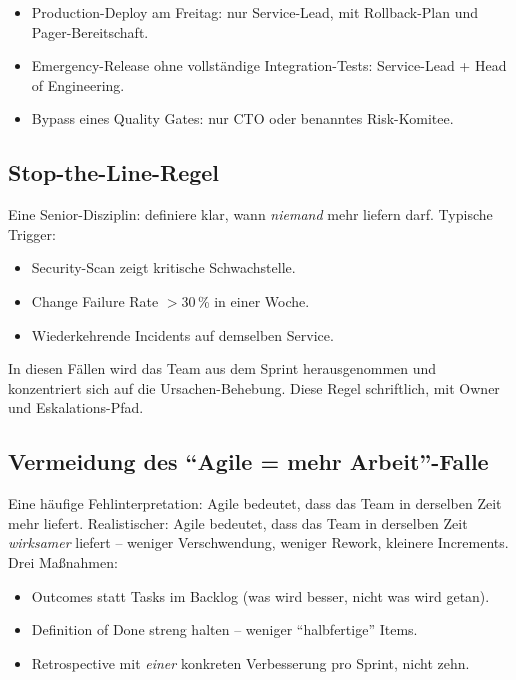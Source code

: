 \documentclass[11pt,a4paper,oneside]{article}
\begin{document}
\begin{itemize}
  \item Production-Deploy am Freitag: nur Service-Lead, mit Rollback-Plan und Pager-Bereitschaft.
  \item Emergency-Release ohne vollständige Integration-Tests: Service-Lead + Head of Engineering.
  \item Bypass eines Quality Gates: nur CTO oder benanntes Risk-Komitee.
\end{itemize}

\subsection{Stop-the-Line-Regel}

Eine Senior-Disziplin: definiere klar, wann \emph{niemand} mehr liefern darf. Typische Trigger:

\begin{itemize}
  \item Security-Scan zeigt kritische Schwachstelle.
  \item Change Failure Rate $>$30\,\% in einer Woche.
  \item Wiederkehrende Incidents auf demselben Service.
\end{itemize}

In diesen Fällen wird das Team aus dem Sprint herausgenommen und konzentriert sich auf die Ursachen-Behebung. Diese Regel schriftlich, mit Owner und Eskalations-Pfad.

\subsection{Vermeidung des ``Agile = mehr Arbeit''-Falle}

Eine häufige Fehlinterpretation: Agile bedeutet, dass das Team in derselben Zeit mehr liefert. Realistischer: Agile bedeutet, dass das Team in derselben Zeit \emph{wirksamer} liefert -- weniger Verschwendung, weniger Rework, kleinere Increments. Drei Maßnahmen:

\begin{itemize}
  \item Outcomes statt Tasks im Backlog (was wird besser, nicht was wird getan).
  \item Definition of Done streng halten -- weniger ``halbfertige'' Items.
  \item Retrospective mit \emph{einer} konkreten Verbesserung pro Sprint, nicht zehn.
\end{itemize}
\end{document}
